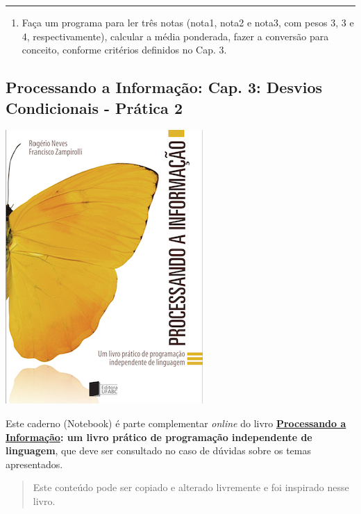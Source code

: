 \documentclass[12pt,a4paper]{article}
\providecommand{\tightlist}{%
      \setlength{\itemsep}{0pt}\setlength{\parskip}{0pt}}
\begin{document}
    \begin{center}\rule{0.5\linewidth}{0.5pt}\end{center}

\begin{enumerate}
\def\labelenumi{\arabic{enumi}.}
\setcounter{enumi}{4}
\tightlist
\item
  Faça um programa para ler três notas (nota1, nota2 e nota3, com pesos
  3, 3 e 4, respectivamente), calcular a média ponderada, fazer a
  conversão para conceito, conforme critérios definidos no Cap. 3.
\end{enumerate}

    \hypertarget{processando-a-informauxe7uxe3o-cap.-3-desvios-condicionais---pruxe1tica-2}{%
\subsection{Processando a Informação: Cap. 3: Desvios Condicionais -
Prática
2}\label{processando-a-informauxe7uxe3o-cap.-3-desvios-condicionais---pruxe1tica-2}}

    \includegraphics{"figs/Capa_Processando_Informacao.jpg"}

Este caderno (Notebook) é parte complementar \emph{online} do livro
\textbf{\href{https://editora.ufabc.edu.br/matematica-e-ciencias-da-computacao/58-processando-a-informacao}{Processando
a Informação}: um livro prático de programação independente de
linguagem}, que deve ser consultado no caso de dúvidas sobre os temas
apresentados.

\begin{quote}
Este conteúdo pode ser copiado e alterado livremente e foi inspirado
nesse livro.
\end{quote}
\end{document}
